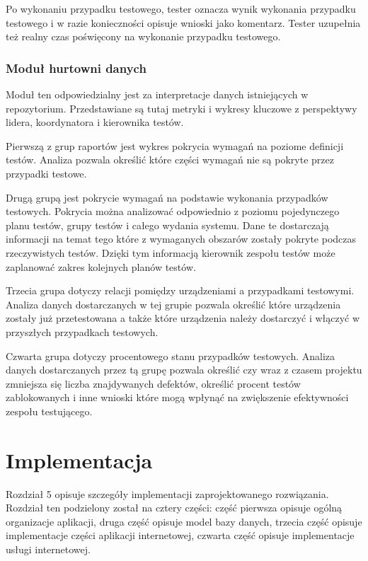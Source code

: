 Po wykonaniu przypadku testowego, tester oznacza wynik wykonania przypadku testowego i w razie konieczności opisuje wnioski jako komentarz. Tester uzupełnia też realny czas poświęcony na wykonanie przypadku testowego.

\subsection{ Moduł hurtowni danych  }

Moduł ten odpowiedzialny jest za interpretacje danych istniejących w repozytorium. Przedstawiane są tutaj metryki i wykresy kluczowe z perspektywy lidera, koordynatora i kierownika testów.

Pierwszą z grup raportów jest wykres pokrycia wymagań na poziome definicji testów. Analiza pozwala określić które części wymagań nie są pokryte przez przypadki testowe.

Drugą grupą jest pokrycie wymagań na podstawie wykonania przypadków testowych. Pokrycia można analizować odpowiednio z poziomu pojedynczego planu testów, grupy testów i całego wydania systemu. Dane te dostarczają informacji na temat tego które z wymaganych obszarów zostały pokryte podczas rzeczywistych testów. Dzięki tym informacją kierownik zespołu testów może zaplanować zakres kolejnych planów testów.

Trzecia grupa dotyczy relacji pomiędzy urządzeniami a przypadkami testowymi. Analiza danych dostarczanych w tej grupie pozwala określić które urządzenia zostały już przetestowana a także które urządzenia należy dostarczyć i włączyć w przyszłych przypadkach testowych.

Czwarta grupa dotyczy procentowego stanu przypadków testowych. Analiza danych dostarczanych przez tą grupę pozwala określić czy wraz z czasem projektu zmniejsza się liczba znajdywanych defektów, określić procent testów zablokowanych i inne wnioski które mogą wpłynąć na zwiększenie efektywności zespołu testującego.



\chapter{Implementacja}

Rozdział 5 opisuje szczegóły implementacji zaprojektowanego rozwiązania. Rozdział ten podzielony został na cztery części: część pierwsza opisuje ogólną organizacje aplikacji, druga część opisuje model bazy danych, trzecia część opisuje implementacje części aplikacji internetowej, czwarta część opisuje implementacje usługi internetowej.

